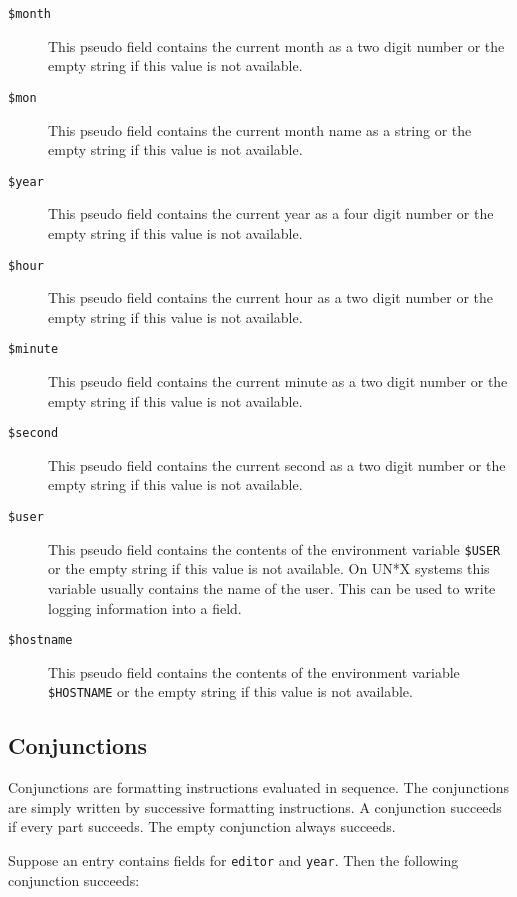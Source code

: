 \documentclass[11pt,a4paper]{scrbook}
\begin{document}
\begin{description}
\item [\texttt{\$month}]%
  This pseudo field contains the current month as a two digit number or the
  empty string if this value is not available. 

\item [\texttt{\$mon}]%
  This pseudo field contains the current month name as a string or the
  empty string if this value is not available. 

\item [\texttt{\$year}]%
  This pseudo field contains the current year as a four digit number or the
  empty string if this value is not available. 

\item [\texttt{\$hour}]%
  This pseudo field contains the current hour as a two digit number or the
  empty string if this value is not available. 

\item [\texttt{\$minute}]%
  This pseudo field contains the current minute as a two digit number or the
  empty string if this value is not available. 

\item [\texttt{\$second}]%
  This pseudo field contains the current second as a two digit number or the
  empty string if this value is not available. 
  
\item [\texttt{\$user}] %
  This pseudo field contains the contents of the environment variable
  \texttt{\$USER} or the empty string if this value is not available. On UN*X
  systems this variable usually contains the name of the user. This can be
  used to write logging information into a field.

\item [\texttt{\$hostname}]%
  This pseudo field contains the contents of the environment variable
  \texttt{\$HOSTNAME} or the empty string if this value is not available.
\end{description}


\subsection{Conjunctions}

Conjunctions are formatting instructions evaluated in sequence. The
conjunctions are simply written by successive formatting instructions. A
conjunction succeeds if every part succeeds. The empty conjunction always
succeeds.

Suppose an \BibTeX{} entry contains fields for \texttt{editor} and
\texttt{year}.  Then the following conjunction succeeds:
\end{document}
